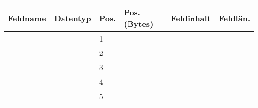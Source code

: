 \begin{beamerText}
\begin{Form}
{\small
\begin{tabular}{  p{3cm}  p{2.5cm}  p{0.7cm}  p{2cm}  p{4cm}  p{1.5cm} }
	\hline\hline
	\small{\textbf{Feldname}}                                               & \small{\textbf{Datentyp}}                                                 & \small{\textbf{Pos.}} & \small{\textbf{Pos. (Bytes)}}                                       & \small{\textbf{Feldinhalt}}                                               & \small{\textbf{Feldlän.}}                                               \\ \hline\hline
	\TextField[name=Feldname1, width=3cm, height=0.5cm, charsize = 10pt]{}  & \TextField[name=Datentyp1, width=2.5cm, height=0.5cm, charsize = 10pt]{}  & 1                     & \TextField[name=PosB1, width=2cm, height=0.5cm, charsize = 10pt]{}  & \TextField[name=Feldinhalt1, width=4cm, height=0.5cm, charsize = 10pt]{}  & \TextField[name=Laenge1, width=1.5cm, height=0.5cm, charsize = 10pt]{}  \\ \hline
	\TextField[name=Feldname2, width=3cm, height=0.5cm, charsize = 10pt]{}  & \TextField[name=Datentyp2, width=2.5cm, height=0.5cm, charsize = 10pt]{}  & 2                     & \TextField[name=PosB2, width=2cm, height=0.5cm, charsize = 10pt]{}  & \TextField[name=Feldinhalt2, width=4cm, height=0.5cm, charsize = 10pt]{}  & \TextField[name=Laenge2, width=1.5cm, height=0.5cm, charsize = 10pt]{}  \\ \hline
	\TextField[name=Feldname3, width=3cm, height=0.5cm, charsize = 10pt]{}  & \TextField[name=Datentyp3, width=2.5cm, height=0.5cm, charsize = 10pt]{}  & 3                     & \TextField[name=PosB3, width=2cm, height=0.5cm, charsize = 10pt]{}  & \TextField[name=Feldinhalt3, width=4cm, height=0.5cm, charsize = 10pt]{}  & \TextField[name=Laenge3, width=1.5cm, height=0.5cm, charsize = 10pt]{}  \\ \hline
	\TextField[name=Feldname4, width=3cm, height=0.5cm, charsize = 10pt]{}  & \TextField[name=Datentyp4, width=2.5cm, height=0.5cm, charsize = 10pt]{}  & 4                     & \TextField[name=PosB4, width=2cm, height=0.5cm, charsize = 10pt]{}  & \TextField[name=Feldinhalt4, width=4cm, height=0.5cm, charsize = 10pt]{}  & \TextField[name=Laenge4, width=1.5cm, height=0.5cm, charsize = 10pt]{}  \\ \hline
	\TextField[name=Feldname5, width=3cm, height=0.5cm, charsize = 10pt]{}  & \TextField[name=Datentyp5, width=2.5cm, height=0.5cm, charsize = 10pt]{}  & 5                     & \TextField[name=PosB5, width=2cm, height=0.5cm, charsize = 10pt]{}  & \TextField[name=Feldinhalt5, width=4cm, height=0.5cm, charsize = 10pt]{}  & \TextField[name=Laenge5, width=1.5cm, height=0.5cm, charsize = 10pt]{}  \\ \hline

\end{tabular}}
\end{Form}
\end{beamerText}
